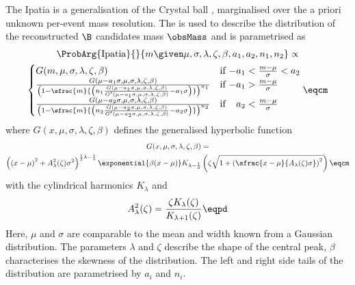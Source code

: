 The Ipatia \PDF \cite{Santos:2013gra} is a generalisation of the Crystal ball
\PDF \cite{set:crystalball}, marginalised over the a priori unknown per-event
mass resolution. The \PDF is used to describe the distribution of the
reconstructed $\B$ candidates mass $\obsMass$ and is parametrised as
%
\begin{multline}\label{eq:measurement_of_sin2beta:likelihood_fit:pdfs:ipatia}
  \ProbArg{\text{Ipatia}}{}{m \given \mu, \sigma, \lambda, \zeta, \beta, a_1, a_2, n_1, n_2} \propto \\
    \begin{cases}
      G(m, \mu, \sigma, \lambda, \zeta, \beta)    & \text{if $-a_1 < \frac{m-\mu}{\sigma} < a_2$} \\
      \frac{G(\mu - a_1 \sigma, \mu, \sigma, \lambda, \zeta, \beta)}{
        \left( 1 - \sfrac{m}{\left( n_1 \frac{G(\mu - a_1 \sigma, \mu, \sigma, \lambda, \zeta, \beta)}{G^\prime(\mu - a_1 \sigma, \mu, \sigma, \lambda, \zeta, \beta)} - a_1 \sigma \right)} \right)^{n_1}
      }     & \text{if $-a_1 > \frac{m-\mu}{\sigma}$} \\
      \frac{G(\mu - a_2 \sigma, \mu, \sigma, \lambda, \zeta, \beta)}{
        \left( 1 - \sfrac{m}{\left( n_2 \frac{G(\mu - a_2 \sigma, \mu, \sigma, \lambda, \zeta, \beta)}{G^\prime(\mu - a_2 \sigma, \mu, \sigma, \lambda, \zeta, \beta)} - a_2 \sigma \right)} \right)^{n_2}
      }     & \text{if $\phantom{-}a_2 < \frac{m-\mu}{\sigma}$} \\
  \end{cases}\eqcm
\end{multline}
%
where $G(x, \mu, \sigma, \lambda, \zeta, \beta)$ defines the generalised hyperbolic function
\begin{multline}\label{eq:measurement_of_sin2beta:likelihood_fit:pdfs:generalised_hyperbolic}
  G(x, \mu, \sigma, \lambda, \zeta, \beta) = \\
  \left(\left(x - \mu\right)^2 + A_\lambda^2(\zeta) \sigma^2 \right)^{\frac{1}{2} \lambda - \frac{1}{4}}
  \exponential{\beta (x - \mu)} K_{\lambda-\frac{1}{2}}
  \left(\zeta \sqrt{1 + \left(\sfrac{x - \mu}{A_\lambda(\zeta) \sigma}\right)^2} \right)\eqcm
\end{multline}
%
with the cylindrical harmonics $K_\lambda$ and
%
\begin{equation}
  A_\lambda^2(\zeta) = \frac{\zeta K_\lambda(\zeta)}{K_{\lambda+1}(\zeta)}\eqpd
\end{equation}
%
Here, $\mu$ and $\sigma$ are comparable to the mean and width known from a
Gaussian distribution. The parameters $\lambda$ and $\zeta$ describe the shape
of the central peak, $\beta$ characterises the skewness of the distribution.
The left and right side tails of the distribution are parametrised by $a_i$ and
$n_i$.

